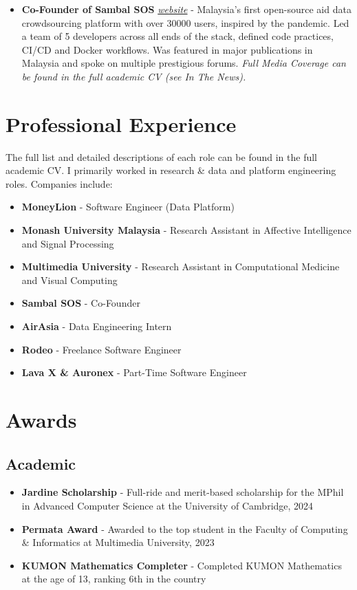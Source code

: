 \documentclass{article}
\begin{document}
\begin{itemize}
    \item \textbf{Co-Founder of Sambal SOS} \href{https://www.sambalsos.com/}{\textit{website}} - Malaysia's first open-source aid data crowdsourcing platform with over 30000 users, inspired by the pandemic. Led a team of 5 developers across all ends of the stack, defined code practices, CI/CD and Docker workflows. Was featured in major publications in Malaysia and spoke on multiple prestigious forums. \textit{Full Media Coverage can be found in the full academic CV (see In The News).}
\end{itemize}

\section{Professional Experience}

The full list and detailed descriptions of each role can be found in the full academic CV. I primarily worked in research \& data and platform engineering roles. Companies include:

\begin{itemize}
    \item \textbf{MoneyLion} - Software Engineer (Data Platform)
    \item \textbf{Monash University Malaysia} - Research Assistant in Affective Intelligence and Signal Processing
    \item \textbf{Multimedia University} - Research Assistant in Computational Medicine and Visual Computing
    \item \textbf{Sambal SOS} - Co-Founder
    \item \textbf{AirAsia} - Data Engineering Intern
    \item \textbf{Rodeo} - Freelance Software Engineer
    \item \textbf{Lava X \& Auronex} - Part-Time Software Engineer
\end{itemize}

\section{Awards}

\subsection{Academic}

\begin{itemize}
    \item \textbf{Jardine Scholarship} - Full-ride and merit-based scholarship for the MPhil in Advanced Computer Science at the University of Cambridge, 2024
    \item \textbf{Permata Award} - Awarded to the top student in the Faculty of Computing \& Informatics at Multimedia University, 2023
    \item \textbf{KUMON Mathematics Completer} - Completed KUMON Mathematics at the age of 13, ranking 6th in the country
\end{itemize}
\end{document}
